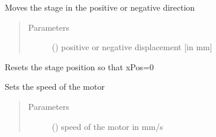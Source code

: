 \documentclass[letterpaper,10pt,english]{sphinxmanual}
\begin{document}
\begin{fulllineitems}
\begin{fulllineitems}
\label{\detokenize{drivers:drivers.Motor.move}}
Moves the stage in the positive or negative direction
\begin{quote}\begin{description}
\item[{Parameters}] \leavevmode
{} (\sphinxstyleliteralemphasis{\sphinxupquote{, }}) \textendash{} positive or negative displacement {[}in mm{]}

\end{description}\end{quote}

\end{fulllineitems}


\begin{fulllineitems}
\label{\detokenize{drivers:drivers.Motor.reset}}
Resets the stage position so that xPos=0

\end{fulllineitems}


\begin{fulllineitems}
\label{\detokenize{drivers:drivers.Motor.set_speed}}
Sets the speed of the motor
\begin{quote}\begin{description}
\item[{Parameters}] \leavevmode
{} (\sphinxstyleliteralemphasis{\sphinxupquote{, }}) \textendash{} speed of the motor in mm/s

\end{description}\end{quote}

\end{fulllineitems}


\end{fulllineitems}
\end{document}
